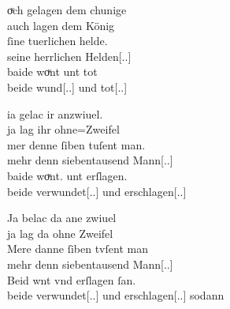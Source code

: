 \begin{exe}
\ex \label{ex:konjadjvvbeide}
    \begin{xlist}
	\ex \label{ex:konjadjvvbeide_1} %
		\gll oͮch gelagen dem chunige \\
			auch lagen dem König \\
	\sn \gll ſine tuerlichen helde. \\
			seine herrlichen Helden[\Nom.\Pl.\MascM] \\
	\sn \gll baide woͮnt unt tot \\
			beide wund[\Nom.\Pl.\MascM] und tot[\Nom.\Pl.\MascM] \\
		\begin{taggedline}{\parencites[\pno~67vb,35--36]{kc:A1}[vgl.][15880--15882]{schroeder1895}}
			\trans {}
		\end{taggedline}
	
	\ex \label{ex:konjadjvvbeide_2} %
		\begin{taggedline}{\parencites[\pno~72ra,32--34]{kc:A1}[vgl.][16891--16893]{schroeder1895}}
		\gll ia gelac ir anzwiuel. \\
			ja lag ihr ohne=Zweifel \\
	\sn \gll mer denne {ſiben tuſent} man. \\
			mehr denn siebentausend Mann[\Nom.\Pl.\MascM] \\
	\sn \gll baide woͮnt. unt erſlagen. \\
			beide verwundet[\Nom.\Pl.\MascM] und erschlagen[\Nom.\Pl.\MascM] \\
		\end{taggedline}
	
	\ex \label{ex:konjadjvvbeide_3} %
		\gll Ja belac da ane zwiuel \\
			ja lag da ohne Zweifel \\
	\sn \gll Mere danne {ſiben tvſent} man \\
			mehr denn siebentausend Mann[\Nom.\Pl.\MascM] \\
	\sn \gll Beid wnt vnd erſlagen ſan. \\
			beide verwundet[\Nom.\Pl.\MascM] und erschlagen[\Nom.\Pl.\MascM]
			sodann \\
		\begin{taggedline}{\parencites[\pno~110va,9--11]{kc:VB}[vgl.][16891--16893]{schroeder1895}}
		\trans {}
		\end{taggedline}


\end{xlist}
\end{exe}
